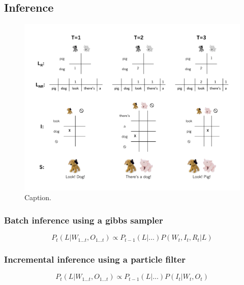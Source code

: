 \documentclass[man,noapacite]{apa2}
\begin{document}
\subsection{Inference}
\begin{figure}[tr]
\begin{center}
\includegraphics[width=6.5in]{figures/inference_diagram.pdf}
\caption{\label{fig:inference_diagram} Caption.}
\end{center}
\end{figure}

\subsubsection{Batch inference using a gibbs sampler}

\begin{equation}
P_t(L|W_{1...t}, O_{1...t}) \propto P_{t-1}(L | ...) P(W_t, I_t, R_t | L)
\end{equation}


\subsubsection{Incremental inference using a particle filter}

\begin{equation}
P_t(L|W_{1...t}, O_{1...t}) \propto P_{t-1}(L | ...) P(I_t | W_t, O_t)
\end{equation}
\end{document}
